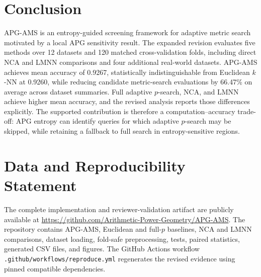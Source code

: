 \documentclass[11pt]{article}
\begin{document}
\section{Conclusion}
APG-AMS is an entropy-guided screening framework for adaptive metric search motivated by a local APG sensitivity result. The expanded revision evaluates five methods over 12 datasets and 120 matched cross-validation folds, including direct NCA and LMNN comparisons and four additional real-world datasets. APG-AMS achieves mean accuracy of 0.9267, statistically indistinguishable from Euclidean $k$-NN at 0.9260, while reducing candidate metric-search evaluations by 66.47\% on average across dataset summaries. Full adaptive $p$-search, NCA, and LMNN achieve higher mean accuracy, and the revised analysis reports those differences explicitly. The supported contribution is therefore a computation--accuracy trade-off: APG entropy can identify queries for which adaptive $p$-search may be skipped, while retaining a fallback to full search in entropy-sensitive regions.

\section*{Data and Reproducibility Statement}
The complete implementation and reviewer-validation artifact are publicly available at \url{https://github.com/Arithmetic-Power-Geometry/APG-AMS}. The repository contains APG-AMS, Euclidean and full-$p$ baselines, NCA and LMNN comparisons, dataset loading, fold-safe preprocessing, tests, paired statistics, generated CSV files, and figures. The GitHub Actions workflow \texttt{.github/workflows/reproduce.yml} regenerates the revised evidence using pinned compatible dependencies.
\end{document}
